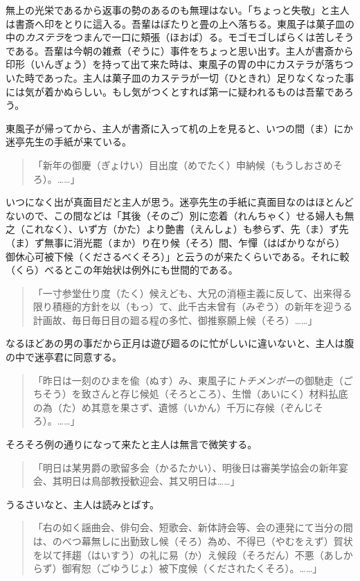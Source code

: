 \documentclass{book}
\begin{document}
無上の光栄であるから返事の勢のあるのも無理はない。「ちょっと失敬」と主人は書斎へ印をとりに這入る。吾輩はぼたりと畳の上へ落ちる。東風子は菓子皿の中の\emph{カステラ}をつまんで一口に頬張（ほおば）る。モゴモゴしばらくは苦しそうである。吾輩は今朝の雑煮（ぞうに）事件をちょっと思い出す。主人が書斎から印形（いんぎょう）を持って出て来た時は、東風子の胃の中にカステラが落ちついた時であった。主人は菓子皿のカステラが一切（ひときれ）足りなくなった事には気が着かぬらしい。もし気がつくとすれば第一に疑われるものは吾輩であろう。

東風子が帰ってから、主人が書斎に入って机の上を見ると、いつの間（ま）にか迷亭先生の手紙が来ている。

\blockquote{「新年の御慶（ぎょけい）目出度（めでたく）申納候（もうしおさめそろ）。\ldots{}\ldots{}」}

いつになく出が真面目だと主人が思う。迷亭先生の手紙に真面目なのはほとんどないので、この間などは「其後（そのご）別に恋着（れんちゃく）せる婦人も無之（これなく）、いず方（かた）より艶書（えんしょ）も参らず、先（ま）ず先（ま）ず無事に消光罷（まか）り在り候（そろ）間、乍憚（はばかりながら）御休心可被下候（くださるべくそろ）」と云うのが来たくらいである。それに較（くら）べるとこの年始状は例外にも世間的である。

\blockquote{「一寸参堂仕り度（たく）候えども、大兄の消極主義に反して、出来得る限り積極的方針を以（もっ）て、此千古未曾有（みぞう）の新年を迎うる計画故、毎日毎日目の廻る程の多忙、御推察願上候（そろ）\ldots{}\ldots{}」}

なるほどあの男の事だから正月は遊び廻るのに忙がしいに違いないと、主人は腹の中で迷亭君に同意する。

\blockquote{「昨日は一刻のひまを偸（ぬす）み、東風子に\emph{トチメンボー}の御馳走（ごちそう）を致さんと存じ候処（そろところ）、生憎（あいにく）材料払底の為（た）め其意を果さず、遺憾（いかん）千万に存候（ぞんじそろ）。\ldots{}\ldots{}」}

そろそろ例の通りになって来たと主人は無言で微笑する。

\blockquote{「明日は某男爵の歌留多会（かるたかい）、明後日は審美学協会の新年宴会、其明日は鳥部教授歓迎会、其又明日は\ldots{}\ldots{}」}

うるさいなと、主人は読みとばす。

\blockquote{「右の如く謡曲会、俳句会、短歌会、新体詩会等、会の連発にて当分の間は、のべつ幕無しに出勤致し候（そろ）為め、不得已（やむをえず）賀状を以て拝趨（はいすう）の礼に易（か）え候段（そろだん）不悪（あしからず）御宥恕（ごゆうじょ）被下度候（くだされたくそろ）。\ldots{}\ldots{}」}
\end{document}
